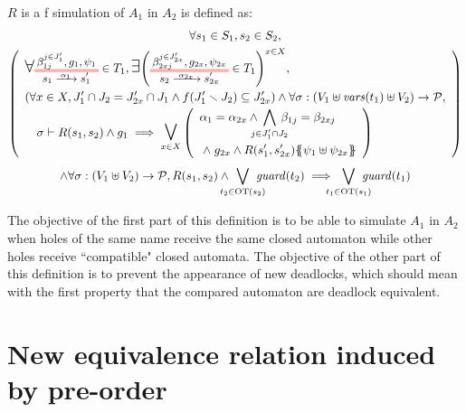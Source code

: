 \documentclass{article}
\begin{document}
\begin{defi}[f simulation]
\(R\) is a f simulation of \(A_1\) in \(A_2\) is defined as:
\begin{multline*}
	\forall s_1 \in S_1, s_2 \in S_2, \\
	\mpar{\renewcommand\arraystretch{1.4}\everymath{\displaystyle}\begin{array}{l}
		\bigsymb{\forall} \OTx{1}{}{1}{1} \in T_1, \bigsymb{\exists} \mpar{\OTx{2}{x}{2x}{2x} \in T_1}^{x \in X}, \\
		\mpar{\forall x \in X, J'_1 \cap J_2 = J'_{2x} \cap J_1 \wedge f\mpar{J'_1 \setminus J_2} \subseteq J'_{2x}} \wedge \forall \sigma: \mpar{V_1 \uplus \fvars{t_1} \uplus V_2} \to \values, \\
		\quad \sigma \vdash R\mpar{s_1, s_2} \wedge g_1 \implies \operatorname*{\bigsymb{\bigvee}}_{x \in X} \mpar{\begin{array}{l}
			\alpha_1 = \alpha_{2x} \wedge \bigwedge_\subbox{j \in J'_1 \cap J_2} \beta_{1j} = \beta_{2xj} \\
			\nwedge g_{2x} \wedge R\mpar{s'_1, s'_{2x}}\psubst{\psi_1 \uplus \psi_{2x}}
		\end{array}} \\
	\end{array}} \\
	\wedge \forall \sigma: \mpar{V_1 \uplus V_2} \to \values, R\mpar{s_1, s_2} \wedge \bigvee_\subbox{t_2 \in \fOT{s_2}} \fguard{t_2} \implies \bigvee_\subbox{t_1 \in \fOT{s_1}} \fguard{t_1}
\end{multline*}
\end{defi}
The objective of the first part of this definition is to be able to simulate \(A_1\) in \(A_2\) when holes of the same name receive the same closed automaton while other holes receive ``compatible" closed automata.
The objective of the other part of this definition is to prevent the appearance of new deadlocks, which should mean with the first property that the compared automaton are deadlock equivalent.


\section{New equivalence relation induced by pre-order}
\end{document}
